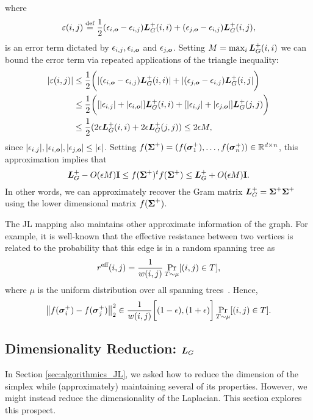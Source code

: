 where 
\[\varepsilon(i,j)\overset{\text{def}}{=} \frac{1}{2}(\epsilon_{i,\vb*{o}}-\epsilon_{i,j})\vb*{L}_G^+(i,i) + (\epsilon_{j,\vb*{o}}-\epsilon_{i,j})\vb*{L}_G^+(i,j),\]
is an error term dictated by $\epsilon_{i,j}, \epsilon_{i,\vb*{o}}$ and $\epsilon_{j,\vb*{o}}$. Setting $M= \max_i \vb*{L}_G^+(i,i)$ 
we can bound the error term via repeated applications of the triangle inequality: 
\begin{align*}
|\varepsilon(i,j)|& \leq \frac{1}{2}\bigg(|(\epsilon_{i,\vb*{o}}-\epsilon_{i,j})\vb*{L}_G^+(i,i)| + |(\epsilon_{j,\vb*{o}}-\epsilon_{i,j})\vb*{L}_G^+(i,j|\bigg) \\
& \leq \frac{1}{2}\bigg([|\epsilon_{i,j}|+|\epsilon_{i,\vb*{o}}|]\vb*{L}_G^+(i,i) + [|\epsilon_{i,j}|+|\epsilon_{j,\vb*{o}}|]\vb*{L}_G^+(j,j)\bigg) \\
&\leq \frac{1}{2} ( 2\epsilon\vb*{L}_G^+(i,i) + 2\epsilon\vb*{L}_G^+(j,j) ) \leq 2\epsilon M,
\end{align*}
since $|\epsilon_{i,j}|, |\epsilon_{i,\vb*{o}}|,|\epsilon_{j,\vb*{o}}|\leq |\epsilon|$. Setting $f(\boldsymbol{\Sigma}^+) = (f(\vb*{\sigma}_1^+),\dots,f(\vb*{\sigma}_n^+))\in \mathbb{R}^{d\times n}$, this approximation implies that 
\begin{equation*}
\vb*{L}_G^+ - O(\epsilon M)\vb{I} \leq f(\boldsymbol{\Sigma}^+)^t f(\boldsymbol{\Sigma}^+) \leq \vb*{L}_G^+ + O(\epsilon M)\vb{I}. 
\end{equation*}
In other words, we can approximately recover the Gram matrix $\vb*{L}_G^+=\boldsymbol{\Sigma}^+\boldsymbol{\Sigma}^+$ using the lower dimensional matrix $f(\boldsymbol{\Sigma}^+)$. 

The JL mapping also maintains other approximate information of the graph.  For  example,  it is well-known that the effective resistance between two vertices is related to the probability that this edge  is in a random  spanning  tree as 
\begin{equation*}
	r^{\textnormal{eff}}(i,j) = \frac{1}{w(i,j)} \Pr_{T\sim \mu}[(i,j)\in T],
\end{equation*}
where $\mu$ is the uniform distribution over all spanning trees~\cite{burton1993local}. Hence, 
\begin{equation*}
\norm{f(\vb*{\sigma}_i^+)-f(\vb*{\sigma}_j^+)}_2^2 \in \frac{1}{w(i,j)}\bigg[(1-\epsilon),(1+\epsilon)\bigg]\Pr_{T\sim \mu}[(i,j)\in T].
\end{equation*}
	

\subsection{Dimensionality Reduction: \texorpdfstring{$\vb*{L}_G$}{the Laplacian}}
\label{sec:algorithmics_low_rank}
In Section  \ref{sec:algorithmics_JL}, we asked how to reduce the  dimension of the  simplex  while (approximately) maintaining several of its  properties. However,  we might instead  reduce the dimensionality of the  Laplacian. This section explores this prospect. 



